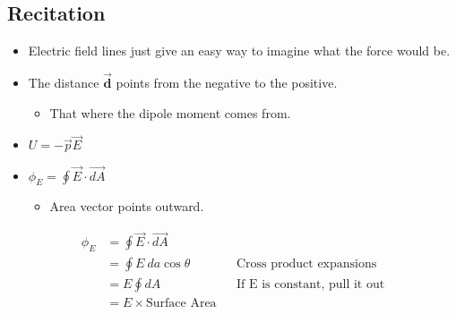 \documentclass[11pt]{article}
\begin{document}
\subsection{Recitation}
\begin{itemize}
    \item Electric field lines just give an easy way to imagine what the force would be.
    \item The distance $\vec{\mathbf{d}}$ points from the negative to the positive.
    \begin{itemize}
        \item That where the dipole moment comes from.
    \end{itemize}

    \item $U = - \vec{p} \vec{E}$
    \item $\phi _E = \oint \vec{E} \cdot \vec{dA}$
    \begin{itemize}
        \item Area vector points outward.
    \end{itemize}
\end{itemize}

\begin{align}
    \phi _E &= \oint \vec{E} \cdot \vec{dA}\\
    &= \oint E \ da \cos \theta && \text{Cross product expansions} \\
    &= E \oint dA && \text{If E is constant, pull it out} \\
    &= E \times \text{Surface Area} \\
\end{align}
\end{document}
